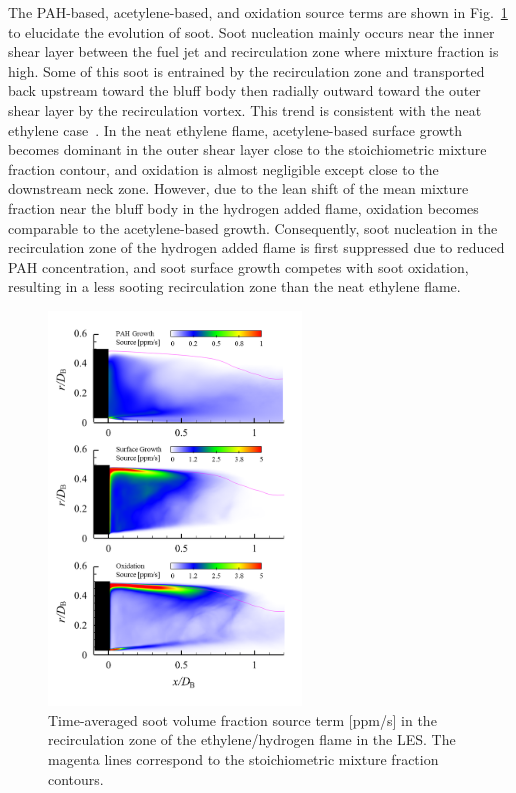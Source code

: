 The PAH-based, acetylene-based, and oxidation source terms are shown in Fig.~\ref{fig:sourceterms} to elucidate the evolution of soot. Soot nucleation mainly occurs near the inner shear layer between the fuel jet and recirculation zone where mixture fraction is high.  Some of this soot is entrained by the recirculation zone and transported back upstream toward the bluff body then radially outward toward the outer shear layer by the recirculation vortex.  This trend is consistent with the neat ethylene case~\cite{mueller13}.  In the neat ethylene flame, acetylene-based surface growth becomes dominant in the outer shear layer close to the stoichiometric mixture fraction contour, and oxidation is almost negligible except close to the downstream neck zone.  However, due to the lean shift of the mean mixture fraction near the bluff body in the hydrogen added flame, oxidation becomes comparable to the acetylene-based growth.  Consequently, soot nucleation in the recirculation zone of the hydrogen added flame is first suppressed due to reduced PAH concentration, and soot surface growth competes with soot oxidation, resulting in a less sooting recirculation zone than the neat ethylene flame.

 \begin{figure}[t]
  \centering
  \scriptsize
  \includegraphics[trim=5mm 5.0mm 10mm 3.0mm, clip=true, width=0.6\textwidth]{ch-bluff/sourceterm.png}
  \normalsize
  \caption{Time-averaged soot volume fraction source term [ppm/s] in the recirculation zone of the ethylene/hydrogen flame in the LES.  The magenta lines correspond to the stoichiometric mixture fraction contours.}
  \label{fig:sourceterms}
\end{figure}

